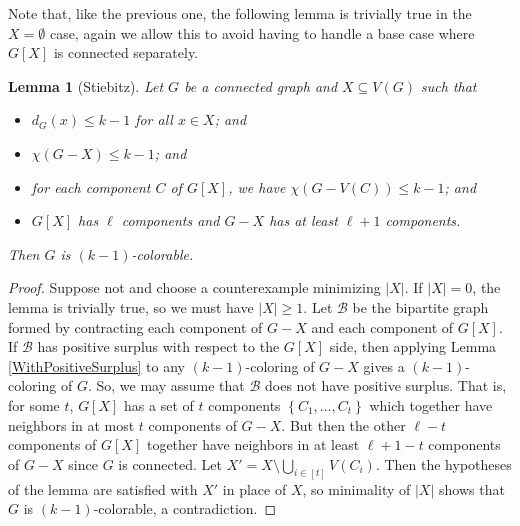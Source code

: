 \documentclass[12pt]{article}
\theoremstyle{plain}
\newtheorem{lem}[thm]{Lemma}
\theoremstyle{definition}
\theoremstyle{remark}
\newcommand{\fancy}[1]{\mathcal{#1}}
\newcommand{\B}{\fancy{B}}
\newcommand{\set}[1]{\left\{ #1 \right\}}
\newcommand{\irange}[1]{\left[#1\right]}
\begin{document}
Note that, like the previous one, the following lemma is trivially true in the $X = \emptyset$ case, again we allow this to avoid having to handle a base case where $G[X]$ is connected separately.
\begin{lem}[Stiebitz]
Let $G$ be a connected graph and $X \subseteq V(G)$ such that
\begin{itemize}
\item $d_G(x) \le k - 1$ for all $x \in X$; and
\item $\chi(G-X) \le k-1$; and
\item for each component $C$ of $G[X]$, we have $\chi(G - V(C)) \le k - 1$; and
\item $G[X]$ has $\ell$ components and $G-X$ has at least $\ell + 1$ components.
\end{itemize}
Then $G$ is $(k-1)$-colorable.
\label{MainLemma}
\end{lem}
\begin{proof}
Suppose not and choose a counterexample minimizing $|X|$.  If $|X| = 0$, the lemma is trivially true, so we must have $|X| \ge 1$.
Let $\B$ be the bipartite graph formed by contracting each component of $G-X$ and each component of $G[X]$.  If $\B$ has positive surplus with respect to the $G[X]$ side, then applying Lemma \ref{WithPositiveSurplus} to any $(k-1)$-coloring of $G-X$ gives a $(k-1)$-coloring of $G$.  So, we may assume that $\B$ does not have positive surplus.  That is, for some $t$, $G[X]$ has a set of $t$ components $\set{C_1, \ldots, C_t}$ which together have neighbors in at most $t$ components of $G-X$.  But then the other $\ell - t$ components of $G[X]$ together have neighbors in at least $\ell + 1 - t$ components of $G-X$ since $G$ is connected.  Let $X' = X \setminus \bigcup_{i \in \irange{t}} V(C_i)$.  Then the hypotheses of the lemma are satisfied with $X'$ in place of $X$, so minimality of $|X|$ shows that $G$ is $(k-1)$-colorable, a contradiction.
\end{proof}



\end{document}

